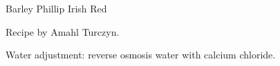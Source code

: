 \stylesection{\styleirishredale}

\begin{recipe}{Barley Phillip Irish Red}

\begin{aboutblock}
Recipe by Amahl Turczyn. 
\end{aboutblock}


\begin{methodandtiming}
 
\begin{mashsteps}
\end{mashsteps}

\begin{fermentationsteps}
\end{fermentationsteps}

\begin{directions}
Water adjustment: reverse osmosis water with  calcium chloride.
\end{directions}

\end{methodandtiming}

\recipebreak

\begin{ingredientsblock}

\begin{malts}
\end{malts}

\begin{hops}
\end{hops}


\end{ingredientsblock}

\end{recipe}

